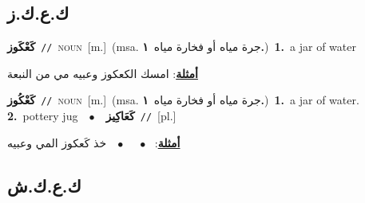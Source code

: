 \documentclass[10pt,a4paper,twoside]{article} %
\begin{document}
\begin{multicols}{2}
\vspace{-3mm}
\subsection*{\color{blue}\foreignlanguage{arabic}{ك.ع.ك.ز}\color{blue}{}} 

{\setlength\topsep{0pt}\textbf{\foreignlanguage{arabic}{كَعْكَوز}}\ {\color{gray}\texttt{//}\color{black}}\ \textsc{noun}\ [m.]\ \color{gray}(msa. \foreignlanguage{arabic}{جرة مياه أو فخارة مياه}~\foreignlanguage{arabic}{\textbf{١.}})\color{black}\ \textbf{1.}~a jar of water\  \begin{flushright}\color{gray}\foreignlanguage{arabic}{\textbf{\underline{\foreignlanguage{arabic}{أمثلة}}}: امسك الكعكوز وعبيه مي من النبعة}\end{flushright}\color{black}} \vspace{2mm}

{\setlength\topsep{0pt}\textbf{\foreignlanguage{arabic}{كَعْكُوز}}\ {\color{gray}\texttt{//}\color{black}}\ \textsc{noun}\ [m.]\ \color{gray}(msa. \foreignlanguage{arabic}{جرة مياه أو فخارة مياه}~\foreignlanguage{arabic}{\textbf{١.}})\color{black}\ \textbf{1.}~a jar of water.  \textbf{2.}~pottery jug\ \ $\bullet$\ \ \setlength\topsep{0pt}\textbf{\foreignlanguage{arabic}{كَعَاكِيز}}\ {\color{gray}\texttt{//}\color{black}}\ [pl.]\  \begin{flushright}\color{gray}\foreignlanguage{arabic}{\textbf{\underline{\foreignlanguage{arabic}{أمثلة}}}: \ $\bullet$\ \  \ $\bullet$\ \  خذ كَعكوز المي وعبيه}\end{flushright}\color{black}} \vspace{2mm}

\vspace{-3mm}
\subsection*{\color{blue}\foreignlanguage{arabic}{ك.ع.ك.ش}\color{blue}{}} 


\end{multicols}
\end{document}
